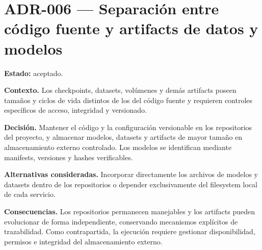\section*{ADR-006 --- Separación entre código fuente y artifacts de datos y modelos}
\label{adr:006-separacion-codigo-artifacts}

\textbf{Estado:} aceptado.

\textbf{Contexto.} Los checkpoints, datasets, volúmenes y demás artifacts poseen tamaños y ciclos de vida distintos de los del código fuente y requieren controles específicos de acceso, integridad y versionado.

\textbf{Decisión.} Mantener el código y la configuración versionable en los repositorios del proyecto, y almacenar modelos, datasets y artifacts de mayor tamaño en almacenamiento externo controlado. Los modelos se identifican mediante manifests, versiones y hashes verificables.

\textbf{Alternativas consideradas.} Incorporar directamente los archivos de modelos y datasets dentro de los repositorios o depender exclusivamente del filesystem local de cada servicio.

\textbf{Consecuencias.} Los repositorios permanecen manejables y los artifacts pueden evolucionar de forma independiente, conservando mecanismos explícitos de trazabilidad. Como contrapartida, la ejecución requiere gestionar disponibilidad, permisos e integridad del almacenamiento externo.

